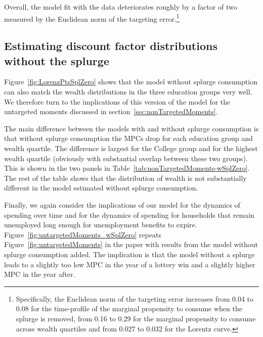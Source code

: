 \documentclass[\latexroot/\projectname]{subfiles}
\begin{document}
Overall, the model fit with the data deteriorates roughly by a factor of two measured by the Euclidean norm of the targeting error.\footnote{Specifically, the Euclidean norm of the targeting error increases from 0.04 to 0.08 for the time-profile of the marginal propensity to consume when the splurge is removed, from 0.16 to 0.29 for the marginal propensity to consume across wealth quartiles and from 0.027 to 0.032 for the Lorentz curve.}



\subsection{Estimating discount factor distributions without the splurge}
\whenintegrated{\label{app:nosplurge-estimating-betas}} 

Figure~\ref{fig:LorenzPtsSplZero} shows that the model without splurge consumption can also match the wealth distributions in the three education groups very well. We therefore turn to the implications of this version of the model for the untargeted moments discussed in section~\ref{sec:nonTargetedMoments}.



The main difference between the models with and without splurge consumption is that without splurge consumption the MPCs drop for each education group and wealth quartile.
The difference is largest for the College group and for the highest wealth quartile (obviously with substantial overlap between these two groups). This is shown in the two panels in Table~\ref{tab:nonTargetedMoments-wSplZero}. The rest of the table shows that the distribution of wealth is not substantially different in the model estimated without splurge consumption.



Finally, we again consider the  implications of our model for the dynamics of spending over time and for the dynamics of spending for households that remain unemployed long enough for unemployment benefits to expire. Figure~\ref{fig:untargetedMoments_wSplZero} repeats Figure~\ref{fig:untargetedMoments} in the paper with results from the model without splurge consumption added. The implication is that the model without a splurge leads to a slightly too low MPC in the year of a lottery win and a slightly higher MPC in the year after.
\end{document}
